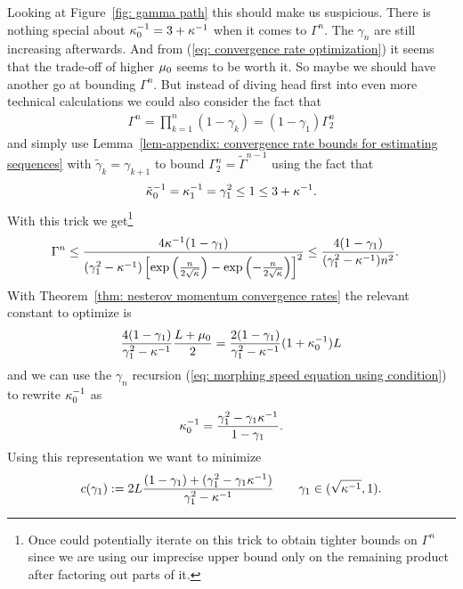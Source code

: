 Looking at Figure~\ref{fig: gamma path} this should make us suspicious. There
is nothing special about \(\kappa_0^{-1}=3+\kappa^{-1}\) when it
comes to \(\Gamma^n\). The \(\gamma_n\) are still increasing afterwards. And
from (\ref{eq: convergence rate optimization}) it seems that the trade-off of
higher \(\mu_0\) seems to be worth it. So maybe we should have another go
at bounding \(\Gamma^n\). But instead of diving head first into even more
technical calculations we could also consider the fact that
\begin{align*}
	\Gamma^n
	= \prod_{k=1}^n (1-\gamma_k)
	= (1-\gamma_1)\Gamma_2^n 
\end{align*}
and simply use Lemma~\ref{lem-appendix: convergence rate bounds for estimating sequences}
with \(\tilde{\gamma}_k = \gamma_{k+1}\) to bound \(\Gamma_2^n=\tilde{\Gamma}^{n-1}\)
using the fact that
\begin{align*}
	\tilde{\kappa}_0^{-1} = \kappa_1^{-1} = \gamma_1^2 \le 1 \le 3+\kappa^{-1}.
\end{align*}
With this trick we get\footnote{Once could potentially iterate on this trick to obtain
tighter bounds on \(\Gamma^n\) since we are using our imprecise upper bound only on the
remaining product after factoring out parts of it.}
\begin{align*}
	\Gamma^n
	&\le \frac{4\kappa^{-1}(1-\gamma_1)}{(\gamma_1^2-\kappa^{-1})\left[
		\exp\left(\frac{n}{2\sqrt{\kappa}}\right)
		-\exp\left(-\frac{n}{2\sqrt{\kappa}}\right)
	\right]^2}
	\le \frac{4(1-\gamma_1)}{(\gamma_1^2-\kappa^{-1})n^2}.
\end{align*}
With Theorem~\ref{thm: nesterov momentum convergence rates} the relevant
constant to optimize is
\begin{align*}
	\frac{4(1-\gamma_1)}{\gamma_1^2-\kappa^{-1}}\frac{L+\mu_0}{2}
	= \frac{2(1-\gamma_1)}{\gamma_1^2-\kappa^{-1}}(1+\kappa_0^{-1})L
\end{align*}
and we can use the \(\gamma_n\) recursion (\ref{eq: morphing speed equation using condition})
to rewrite \(\kappa_0^{-1}\) as
\begin{align*}
	\kappa_0^{-1} = \frac{\gamma_1^2 - \gamma_1\kappa^{-1}}{1-\gamma_1}.
\end{align*}
Using this representation we want to minimize
\begin{align*}
	c(\gamma_1)
	:=2L\frac{(1-\gamma_1) + (\gamma_1^2 - \gamma_1\kappa^{-1})}{\gamma_1^2 -\kappa^{-1}}
	\qquad \gamma_1\in(\sqrt{\kappa^{-1}}, 1).
\end{align*}
